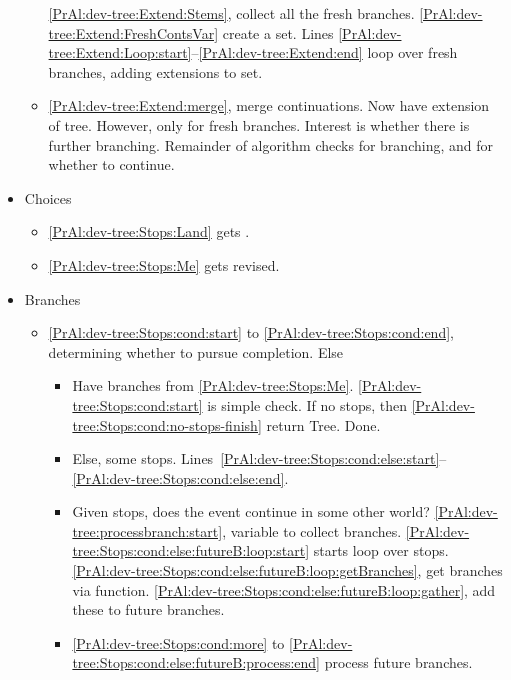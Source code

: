 \begin{note}
\begin{itemize}
\begin{itemize}
      \autoref{PrAl:dev-tree:Extend:Stems}, collect all the fresh branches.
      \autoref{PrAl:dev-tree:Extend:FreshContsVar} create a set.
      Lines \ref{PrAl:dev-tree:Extend:Loop:start}--\ref{PrAl:dev-tree:Extend:end} loop over fresh branches, adding extensions to set.
    \item
      \autoref{PrAl:dev-tree:Extend:merge}, merge continuations.
      Now have extension of tree.
      However, only for fresh branches.
      Interest is whether there is further branching.
      Remainder of algorithm checks for branching, and for whether to continue.
    \end{itemize}
  \item Choices
    \begin{itemize}
    \item
      \autoref{PrAl:dev-tree:Stops:Land} gets \citeauthor{Landman:1992wh}.
    \item
      \autoref{PrAl:dev-tree:Stops:Me} gets revised.
    \end{itemize}
  \item Branches
    \begin{itemize}
    \item
      \autoref{PrAl:dev-tree:Stops:cond:start} to \autoref{PrAl:dev-tree:Stops:cond:end}, determining whether to pursue completion.
      Else 
      \begin{itemize}
      \item
        Have branches from \autoref{PrAl:dev-tree:Stops:Me}.
        \autoref{PrAl:dev-tree:Stops:cond:start} is simple check.
        If no stops, then \autoref{PrAl:dev-tree:Stops:cond:no-stops-finish} return Tree.
        Done.
      \item
        Else, some stops.
        Lines~\ref{PrAl:dev-tree:Stops:cond:else:start}--\ref{PrAl:dev-tree:Stops:cond:else:end}.
      \item
        Given stops, does the event continue in some other world?
        \autoref{PrAl:dev-tree:processbranch:start}, variable to collect branches.
        \autoref{PrAl:dev-tree:Stops:cond:else:futureB:loop:start} starts loop over stops.
        \autoref{PrAl:dev-tree:Stops:cond:else:futureB:loop:getBranches}, get branches via function.
        \autoref{PrAl:dev-tree:Stops:cond:else:futureB:loop:gather}, add these to future branches.
      \item
        \autoref{PrAl:dev-tree:Stops:cond:more} to \autoref{PrAl:dev-tree:Stops:cond:else:futureB:process:end} process future branches.
        \begin{itemize}

\end{itemize}
\end{itemize}
\end{itemize}
\end{itemize}
\end{note}
